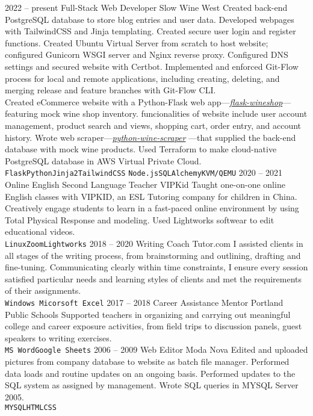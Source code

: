 \documentclass[9pt]{developercv} %
\begin{document}
\begin{entrylist}
		\entry
		{2022 -- present}
		{Full-Stack Web Developer}
		{Slow Wine West}
		{Created back-end PostgreSQL database to store blog entries and user data. Developed webpages with TailwindCSS and
		Jinja templating. Created secure user login and register functions. Created Ubuntu Virtual Server from scratch to host
		website; configured Gunicorn WSGI server and Nginx reverse proxy. Configured DNS settings and secured website with 
		Certbot. Implemented and enforced Git-Flow process for local and remote applications, including creating, deleting, and merging release and 
		feature branches with Git-Flow CLI.\\
		
		
		Created eCommerce website with a Python-Flask web app—{\href{https://Github.com/eriklolson/flask-wineshop}{\itshape flask-wineshop}}—
		featuring mock wine shop inventory. funcionalities of website include user account management, product search and views, shopping cart, 
		order entry, and account history. Wrote web scraper—{\href{https://Github.com/eriklolson/python-wine-scraper}{\itshape python-wine-scraper}}
		—that supplied the back-end database with mock wine products. Used Terraform to make cloud-native PostgreSQL database in AWS Virtual Private 
		Cloud.\\ \texttt{Flask}\slashsep\texttt{Python}\slashsep\texttt{Jinja2}\slashsep\texttt{TailwindCSS}
		\slashsep\texttt{Node.js}\slashsep\texttt{SQLAlchemy}\slashsep\texttt{KVM/QEMU}}
	\entry
		{2020 -- 2021}
		{Online English Second Language Teacher}
		{VIPKid}
		{Taught one-on-one online English classes with VIPKID, an ESL Tutoring company for children in China. Creatively engage students to learn in 		a fast-paced online environment by using Total Physical Response and modeling. Used Lightworks softwear to edit educational videos.
		\\ \texttt{Linux}\slashsep\texttt{Zoom}\slashsep\texttt{Lightworks}}
	\entry
		{2018 -- 2020}
		{Writing Coach}
		{Tutor.com}
		{I assisted clients in all stages of the writing process, from
		brainstorming and outlining, drafting and fine-tuning. Communicating clearly
		within time constraints, I ensure every session satisfied particular needs and
		learning styles of clients and met the requirements of their assignments.
		\\ \texttt{Windows}\slashsep\texttt{ Micorsoft Excel}}
	\entry
		{2017 -- 2018}
		{Career Assistance Mentor}
		{Portland Public Schools}
		{Supported teachers in organizing and carrying out meaningful college and
		career exposure activities, from field trips to discussion panels, guest
		speakers to writing exercises.
		\\ \texttt{MS Word}\slashsep\texttt{Google Sheets}}
	\entry
		{2006 -- 2009}
		{Web Editor}
		{Moda Nova}
		{Edited and uploaded pictures from company database to website as batch file manager. Performed data loads and routine updates on an ongoing 		basis. Performed updates to the SQL system as assigned by management. Wrote SQL queries in MYSQL Server 2005.
		\\ \texttt{MYSQL}\slashsep\texttt{HTML}\slashsep\texttt{CSS}}
\end{entrylist}
\end{document}
